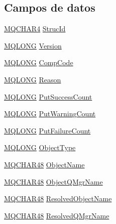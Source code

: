 \subsection*{Campos de datos}
\begin{DoxyCompactItemize}
\item 
\hyperlink{cmqc_8h_a12590e546ed66fda7cf21c1d5cefa31d}{M\+Q\+C\+H\+A\+R4} \hyperlink{structtag_m_q_s_t_s_a0530922ca944569b52601d74941f96e4}{Struc\+Id}
\item 
\hyperlink{cmqc_8h_a1fb8d28cbda3fa8766a9821230cdb6d5}{M\+Q\+L\+O\+N\+G} \hyperlink{structtag_m_q_s_t_s_a0656ef8f766b3907d394d88a35d7b7e9}{Version}
\item 
\hyperlink{cmqc_8h_a1fb8d28cbda3fa8766a9821230cdb6d5}{M\+Q\+L\+O\+N\+G} \hyperlink{structtag_m_q_s_t_s_a3d53860a50c3834d3dad9f5b2e5b5234}{Comp\+Code}
\item 
\hyperlink{cmqc_8h_a1fb8d28cbda3fa8766a9821230cdb6d5}{M\+Q\+L\+O\+N\+G} \hyperlink{structtag_m_q_s_t_s_ac2f0378cb0c66c5f91625822e53d7bae}{Reason}
\item 
\hyperlink{cmqc_8h_a1fb8d28cbda3fa8766a9821230cdb6d5}{M\+Q\+L\+O\+N\+G} \hyperlink{structtag_m_q_s_t_s_a4577d49eab12e56cd487d84e5179beb9}{Put\+Success\+Count}
\item 
\hyperlink{cmqc_8h_a1fb8d28cbda3fa8766a9821230cdb6d5}{M\+Q\+L\+O\+N\+G} \hyperlink{structtag_m_q_s_t_s_a6a179f500b4a403e9609416d7c9cdcc0}{Put\+Warning\+Count}
\item 
\hyperlink{cmqc_8h_a1fb8d28cbda3fa8766a9821230cdb6d5}{M\+Q\+L\+O\+N\+G} \hyperlink{structtag_m_q_s_t_s_a7588d679d3d79c069fdf82aeae32fede}{Put\+Failure\+Count}
\item 
\hyperlink{cmqc_8h_a1fb8d28cbda3fa8766a9821230cdb6d5}{M\+Q\+L\+O\+N\+G} \hyperlink{structtag_m_q_s_t_s_afe2238efcfc6d8a8de58f0622bb31caa}{Object\+Type}
\item 
\hyperlink{cmqc_8h_a53b1a2836da03f19144836725ff77919}{M\+Q\+C\+H\+A\+R48} \hyperlink{structtag_m_q_s_t_s_a2106fb125a9f7fc606340ba23c006bc0}{Object\+Name}
\item 
\hyperlink{cmqc_8h_a53b1a2836da03f19144836725ff77919}{M\+Q\+C\+H\+A\+R48} \hyperlink{structtag_m_q_s_t_s_ac72719d0cdc669269aa503462d5c7536}{Object\+Q\+Mgr\+Name}
\item 
\hyperlink{cmqc_8h_a53b1a2836da03f19144836725ff77919}{M\+Q\+C\+H\+A\+R48} \hyperlink{structtag_m_q_s_t_s_a75cc42c205c810ff5e2d33b15568f940}{Resolved\+Object\+Name}
\item 
\hyperlink{cmqc_8h_a53b1a2836da03f19144836725ff77919}{M\+Q\+C\+H\+A\+R48} \hyperlink{structtag_m_q_s_t_s_af36c1b6e6f3f92e0c733c43da9fada3f}{Resolved\+Q\+Mgr\+Name}

\end{DoxyCompactItemize}
